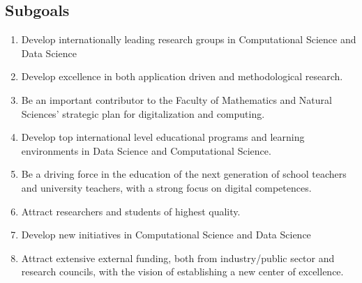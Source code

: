 \documentclass[a4paper,10pt]{article}
\begin{document}
\subsection{Subgoals}

\begin{enumerate} 
\item Develop internationally leading research groups in Computational Science and Data Science
\item Develop excellence in both application driven and methodological research.
\item Be an important contributor to the Faculty of Mathematics and Natural Sciences' strategic plan for digitalization and computing. 
\item Develop top international level educational programs and learning environments in Data Science and Computational Science.
\item Be a driving force in the education of the next generation of school teachers and university teachers, with a strong focus on digital competences.
\item Attract researchers and students of highest quality.
\item Develop new initiatives in Computational Science and Data Science
\item Attract extensive external funding, both from industry/public sector and research councils,  with the vision of establishing a new center of excellence.
\end{enumerate}
\end{document}
